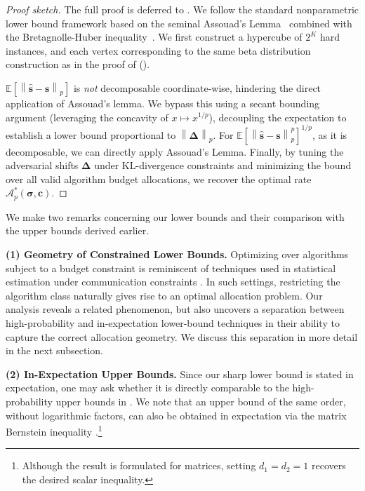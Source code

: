 \documentclass{article}
\def\vc{{\bm{c}}}
\def\vs{{\bm{s}}}
\def\gA{{\mathcal{A}}}
\newcommand{\E}{\mathbb{E}}
\theoremstyle{plain}
\theoremstyle{definition}
\theoremstyle{plain}
\newcommand{\bignorm}[1]{\left\lVert #1 \right\rVert}
\begin{document}
\begin{proof}[Proof sketch]
    The full proof is deferred to .
    We follow the standard nonparametric lower bound framework based on the seminal {{Assouad's Lemma}}~\citep{assouad1983,yu1997lecam} combined with the Bretagnolle-Huber inequality~\citep{bretagnolle-huber}.
    We first construct a hypercube of $2^K$ hard instances, and each vertex corresponding to the same beta distribution construction as in the proof of  ().
    
    $\E[ \bignorm{\hat{\vs} - \vs}_p ]$ is \emph{not} decomposable coordinate-wise, hindering the direct application of Assouad's lemma.
    We bypass this using a secant bounding argument (leveraging the concavity of $x \mapsto x^{1/p}$), decoupling the expectation to establish a lower bound proportional to $\bignorm{\bm\Delta}_p$.
    For $\E[ \bignorm{\hat{\vs} - \vs}_p^p ]^{1/p}$, as it is decomposable, we can directly apply Assouad's Lemma.
    Finally, by tuning the adversarial shifts $\bm\Delta$ under KL-divergence constraints and minimizing the bound over all valid algorithm budget allocations, we recover the optimal rate $\gA_p^*(\bm\sigma, \vc)$.
\end{proof}

We make two remarks concerning our lower bounds and their comparison with the upper bounds derived earlier.

{\bf (1) Geometry of Constrained Lower Bounds.} Optimizing over algorithms subject to a budget constraint is reminiscent of techniques used in statistical estimation under communication constraints \citep{zhu2014quantized,chen2021vantrees,chen2024vantrees}. In such settings, restricting the algorithm class naturally gives rise to an optimal allocation problem. Our analysis reveals a related phenomenon, but also uncovers a separation between high-probability and in-expectation lower-bound techniques in their ability to capture the correct allocation geometry. We discuss this separation in more detail in the next subsection.

{\bf (2) In-Expectation Upper Bounds.} Since our sharp lower bound is stated in expectation, one may ask whether it is directly comparable to the high-probability upper bounds in . We note that an upper bound of the same order, without logarithmic factors, can also be obtained in expectation via the matrix Bernstein inequality \citep[Theorem~6.1.1]{tropp2015survey}.\footnote{Although the result is formulated for matrices, setting \(d_1=d_2=1\) recovers the desired scalar inequality.}
\end{document}
